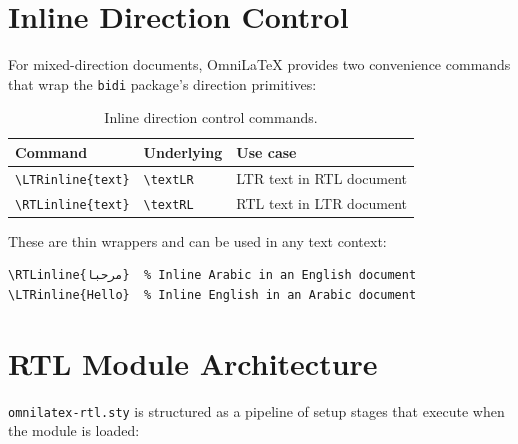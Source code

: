 \section{Inline Direction Control}

For mixed-direction documents, OmniLaTeX provides two convenience commands
that wrap the \texttt{bidi} package's direction primitives:

\begin{table}[htbp]
  \centering
  \caption{Inline direction control commands.}
  \label{tab:rtl-inline}
  \begin{tabular}{@{}lll@{}}
    \toprule
    Command & Underlying & Use case \\
    \midrule
    \texttt{\textbackslash LTRinline\{text\}} & \texttt{\textbackslash textLR} & LTR text in RTL document \\
    \texttt{\textbackslash RTLinline\{text\}} & \texttt{\textbackslash textRL} & RTL text in LTR document \\
    \bottomrule
  \end{tabular}
\end{table}

These are thin wrappers and can be used in any text context:

\begin{verbatim}
\RTLinline{مرحبا}  % Inline Arabic in an English document
\LTRinline{Hello}  % Inline English in an Arabic document
\end{verbatim}

\section{RTL Module Architecture}

\texttt{omnilatex-rtl.sty} is structured as a pipeline of setup stages
that execute when the module is loaded:

